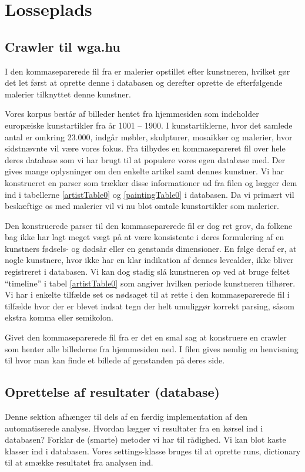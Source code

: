 {\section{Losseplads}

\subsection{Crawler til wga.hu}
I den kommaseparerede fil fra \cite{wgahu} er
malerier opstillet efter kunstneren, hvilket gør det let først at
oprette denne i databasen og derefter oprette de efterfølgende malerier
tilknyttet denne kunstner.

Vores korpus består af billeder hentet fra hjemmesiden \cite{wgahu} som
indeholder europæiske kunstartikler fra år 1001 -- 1900. I
kunstartiklerne, hvor det samlede antal er omkring 23.000, indgår
møbler, skulpturer, mosaikker og malerier, hvor sidstnævnte vil være
vores fokus. Fra \cite{wgahu} tilbydes en kommasepareret fil over hele
deres database som vi har brugt til at populere vores egen database med.
Der gives mange oplysninger om den enkelte artikel samt dennes kunstner.
Vi har konstrueret en parser som trækker disse informationer ud fra
filen og lægger dem ind i tabellerne \ref{artistTable0} og
\ref{paintingTable0} i databasen. Da vi primært vil beskæftige os med
malerier vil vi nu blot omtale kunstartikler som malerier.

Den konstruerede parser til den kommaseparerede fil er dog ret grov, da
folkene bag \cite{wgahu} ikke har lagt meget vægt på at være konsistente
i deres formulering af en kunstners fødsels- og dødsår eller en
genstands dimensioner. En følge deraf er, at nogle kunstnere, hvor
\cite{wgahu} ikke har en klar indikation af dennes levealder, ikke bliver
registreret i databasen. Vi kan dog stadig slå kunstneren op ved at
bruge feltet ``timeline'' i tabel \ref{artistTable0} som angiver hvilken
periode kunstneren tilhører. Vi har i enkelte tilfælde set os nødsaget
til at rette i den kommaseparerede fil i tilfælde hvor der er blevet
indsat tegn der helt umuliggør korrekt parsing, såsom ekstra komma
eller semikolon.

Givet den kommaseparerede fil fra \cite{wgahu} er det en smal sag at
konstruere en crawler som henter alle billederne fra hjemmesiden ned. I
filen gives nemlig en henvisning til hvor man kan finde et billede af
genstanden på deres side.

\subsection{Oprettelse af resultater (database)}
Denne sektion afhænger til dels af en færdig implementation af den
automatiserede analyse. Hvordan lægger vi resultater fra en kørsel ind i
databasen? Forklar de (smarte) metoder vi har til rådighed. Vi kan blot
kaste klasser ind i databasen. Vores settings-klasse bruges til at
oprette runs, dictionary til at smække resultatet fra analysen ind.

}
